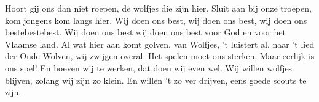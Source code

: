 \beginverse
Hoort gij ons dan niet roepen,
de wolfjes die zijn hier. 
Sluit aan bij onze troepen,
kom jongens kom langs hier.
\endverse
\beginchorus
Wij doen ons best,
wij doen ons best,
wij doen ons bestebestebest.
Wij doen ons best
wij doen ons best
voor God en voor het Vlaamse land.
\endchorus
\beginverse
Al wat hier aan komt golven,
van Wolfjes, 't luistert al,
naar 't lied der Oude Wolven,
wij zwijgen overal.
\endverse
\beginverse
Het spelen moet ons sterken,
Maar eerlijk is ons spel!
En hoeven wij te werken,
dat doen wij even wel.
\endverse
\beginverse
Wij willen wolfjes blijven,
zolang wij zijn zo klein.
En willen 't zo ver drijven,
eens goede scouts te zijn.
\endverse
\endsong